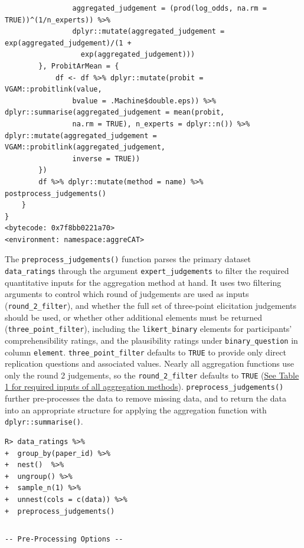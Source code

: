 \documentclass[article]{jss}
\begin{document}
\begin{tcolorbox}[enhanced jigsaw, colback=white, toprule=.15mm, colframe=quarto-callout-color-frame, arc=.35mm, rightrule=.15mm, bottomrule=.15mm, breakable, leftrule=.75mm, left=2mm, opacityback=0]
\begin{verbatim}
                aggregated_judgement = (prod(log_odds, na.rm = TRUE))^(1/n_experts)) %>% 
                dplyr::mutate(aggregated_judgement = exp(aggregated_judgement)/(1 + 
                  exp(aggregated_judgement)))
        }, ProbitArMean = {
            df <- df %>% dplyr::mutate(probit = VGAM::probitlink(value, 
                bvalue = .Machine$double.eps)) %>% dplyr::summarise(aggregated_judgement = mean(probit, 
                na.rm = TRUE), n_experts = dplyr::n()) %>% dplyr::mutate(aggregated_judgement = VGAM::probitlink(aggregated_judgement, 
                inverse = TRUE))
        })
        df %>% dplyr::mutate(method = name) %>% postprocess_judgements()
    }
}
<bytecode: 0x7f8bb0221a70>
<environment: namespace:aggreCAT>
\end{verbatim}

The \texttt{preprocess\_judgements()} function parses the primary
dataset \texttt{data\_ratings} through the argument
\texttt{expert\_judgements} to filter the required quantitative inputs
for the aggregation method at hand. It uses two filtering arguments to
control which round of judgements are used as inputs
(\texttt{round\_2\_filter}), and whether the full set of three-point
elicitation judgements should be used, or whether other additional
elements must be returned (\texttt{three\_point\_filter}), including the
\texttt{likert\_binary} elements for participants' comprehensibility
ratings, and the plausibility ratings under \texttt{binary\_question} in
column \texttt{element}. \texttt{three\_point\_filter} defaults to
\texttt{TRUE} to provide only direct replication questions and
associated values. Nearly all aggregation functions use only the round 2
judgements, so the \texttt{round\_2\_filter} defaults to \texttt{TRUE}
(\protect\hyperlink{table1}{See Table 1 for required inputs of all
aggregation methods}). \texttt{preprocess\_judgements()} further
pre-processes the data to remove missing data, and to return the data
into an appropriate structure for applying the aggregation function with
\texttt{dplyr::summarise()}.

\begin{verbatim}
R> data_ratings %>% 
+  group_by(paper_id) %>% 
+  nest()  %>% 
+  ungroup() %>% 
+  sample_n(1) %>% 
+  unnest(cols = c(data)) %>% 
+  preprocess_judgements()
\end{verbatim}

\begin{verbatim}
\end{verbatim}

\begin{verbatim}
-- Pre-Processing Options --
\end{verbatim}


\end{tcolorbox}
\end{document}
